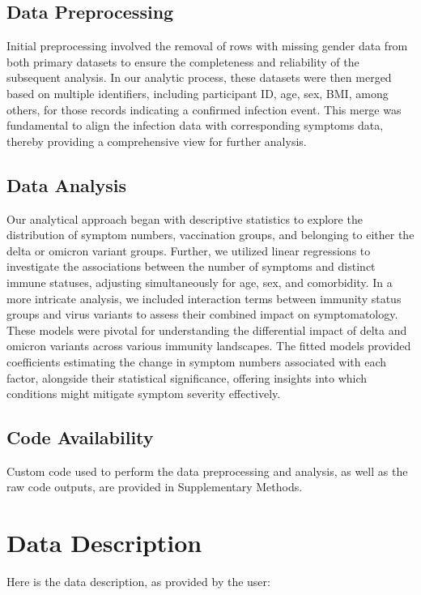 \documentclass[11pt]{article}
\begin{document}
\subsection*{Data Preprocessing}
Initial preprocessing involved the removal of rows with missing gender data from both primary datasets to ensure the completeness and reliability of the subsequent analysis. In our analytic process, these datasets were then merged based on multiple identifiers, including participant ID, age, sex, BMI, among others, for those records indicating a confirmed infection event. This merge was fundamental to align the infection data with corresponding symptoms data, thereby providing a comprehensive view for further analysis.

\subsection*{Data Analysis}
Our analytical approach began with descriptive statistics to explore the distribution of symptom numbers, vaccination groups, and belonging to either the delta or omicron variant groups. Further, we utilized linear regressions to investigate the associations between the number of symptoms and distinct immune statuses, adjusting simultaneously for age, sex, and comorbidity. In a more intricate analysis, we included interaction terms between immunity status groups and virus variants to assess their combined impact on symptomatology. These models were pivotal for understanding the differential impact of delta and omicron variants across various immunity landscapes. The fitted models provided coefficients estimating the change in symptom numbers associated with each factor, alongside their statistical significance, offering insights into which conditions might mitigate symptom severity effectively.\subsection*{Code Availability}

Custom code used to perform the data preprocessing and analysis, as well as the raw code outputs, are provided in Supplementary Methods.






\clearpage
\appendix

\section{Data Description} \label{sec:data_description} Here is the data description, as provided by the user:
\end{document}
